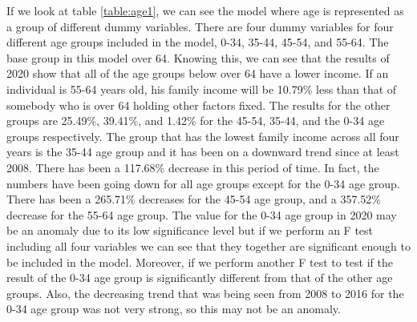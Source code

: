\documentclass[12pt]{article}
\begin{document}
\begin{spacing}{1.5}

If we look at table \ref{table:age1}, we can see the model where age is represented as a group of different dummy variables. There are four dummy variables for four different age groups included in the model, 0-34, 35-44, 45-54, and 55-64. The base group in this model over 64. Knowing this, we can see that the results of 2020 show that all of the age groups below over 64 have a lower income. If an individual is 55-64 years old, his family income will be 10.79\% less than that of somebody who is over 64 holding other factors fixed. The results for the other groups are 25.49\%, 39.41\%, and 1.42\% for the 45-54, 35-44, and the 0-34 age groups respectively. The group that has the lowest family income across all four years is the 35-44 age group and it has been on a downward trend since at least 2008. There has been a 117.68\% decrease in this period of time. In fact, the numbers have been going down for all age groups except for the 0-34 age group. There has been a 265.71\% decreases for the 45-54 age group, and a 357.52\% decrease for the 55-64 age group. The value for the 0-34 age group in 2020 may be an anomaly due to its low significance level but if we perform an F test including all four variables we can see that they together are significant enough to be included in the model. Moreover, if we perform another F test to test if the result of the 0-34 age group is significantly different from that of the other age groups. Also, the decreasing trend that was being seen from 2008 to 2016 for the 0-34 age group was not very strong, so this may not be an anomaly.


\end{spacing}
\end{document}
